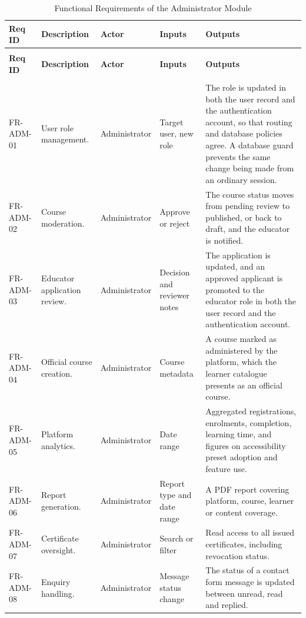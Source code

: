 \documentclass[12pt, oneside]{article} %
\newcommand{\tabbreak}{\hyphenpenalty=200\exhyphenpenalty=200\tolerance=4000\hbadness=10000\hspace{0pt}}
\begin{document}
{
\renewcommand{\arraystretch}{1.2}
\footnotesize
\begin{longtable}{|>{\raggedright\arraybackslash\tabbreak}p{2.09cm}|>{\raggedright\arraybackslash\tabbreak}p{2.92cm}|>{\centering\arraybackslash\tabbreak}p{1.5cm}|>{\raggedright\arraybackslash\tabbreak}p{2.09cm}|>{\raggedright\arraybackslash\tabbreak}p{3.76cm}|}
\caption{Functional Requirements of the Administrator Module}
\label{tab:fr_admin}\\
\hline
\textbf{Req ID} & \textbf{Description} & \textbf{Actor} & \textbf{Inputs} & \textbf{Outputs} \\ \hline \hline
\endfirsthead
\multicolumn{5}{l}{\footnotesize\itshape Table~\ref{tab:fr_admin} continued from the previous page}\\
\hline
\textbf{Req ID} & \textbf{Description} & \textbf{Actor} & \textbf{Inputs} & \textbf{Outputs} \\ \hline \hline
\endhead
\hline
\multicolumn{5}{r}{\footnotesize\itshape continued on the next page}\\
\endfoot
\endlastfoot
FR-ADM-01 & User role management. & Administrator & Target user, new role & The role is updated in both the user record and the authentication account, so that routing and database policies agree. A database guard prevents the same change being made from an ordinary session. \\ \hline
FR-ADM-02 & Course moderation. & Administrator & Approve or reject & The course status moves from pending review to published, or back to draft, and the educator is notified. \\ \hline
FR-ADM-03 & Educator application review. & Administrator & Decision and reviewer notes & The application is updated, and an approved applicant is promoted to the educator role in both the user record and the authentication account. \\ \hline
FR-ADM-04 & Official course creation. & Administrator & Course metadata & A course marked as administered by the platform, which the learner catalogue presents as an official course. \\ \hline
FR-ADM-05 & Platform analytics. & Administrator & Date range & Aggregated registrations, enrolments, completion, learning time, and figures on accessibility preset adoption and feature use. \\ \hline
FR-ADM-06 & Report generation. & Administrator & Report type and date range & A PDF report covering platform, course, learner or content coverage. \\ \hline
FR-ADM-07 & Certificate oversight. & Administrator & Search or filter & Read access to all issued certificates, including revocation status. \\ \hline
FR-ADM-08 & Enquiry handling. & Administrator & Message status change & The status of a contact form message is updated between unread, read and replied. \\ \hline
\end{longtable}
}
\end{document}
